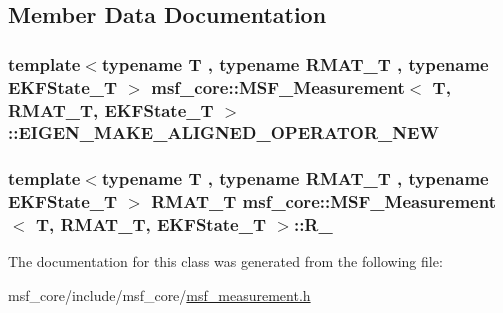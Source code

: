 \subsection{Member Data Documentation}
\hypertarget{classmsf__core_1_1MSF__Measurement_a481fa3230f73f28a8489223311c3033f}{
\subsubsection[{E\-I\-G\-E\-N\-\_\-\-M\-A\-K\-E\-\_\-\-A\-L\-I\-G\-N\-E\-D\-\_\-\-O\-P\-E\-R\-A\-T\-O\-R\-\_\-\-N\-E\-W}]{\setlength{\rightskip}{0pt plus 5cm}template$<$typename T , typename R\-M\-A\-T\-\_\-\-T , typename E\-K\-F\-State\-\_\-\-T $>$ {\bf msf\-\_\-core\-::\-M\-S\-F\-\_\-\-Measurement}$<$ T, R\-M\-A\-T\-\_\-\-T, E\-K\-F\-State\-\_\-\-T $>$\-::E\-I\-G\-E\-N\-\_\-\-M\-A\-K\-E\-\_\-\-A\-L\-I\-G\-N\-E\-D\-\_\-\-O\-P\-E\-R\-A\-T\-O\-R\-\_\-\-N\-E\-W}}\label{classmsf__core_1_1MSF__Measurement_a481fa3230f73f28a8489223311c3033f}
\hypertarget{classmsf__core_1_1MSF__Measurement_a20fcacb533df8a1e6ae4fad4a3eb06ec}{
\subsubsection[{R\-\_\-}]{\setlength{\rightskip}{0pt plus 5cm}template$<$typename T , typename R\-M\-A\-T\-\_\-\-T , typename E\-K\-F\-State\-\_\-\-T $>$ R\-M\-A\-T\-\_\-\-T {\bf msf\-\_\-core\-::\-M\-S\-F\-\_\-\-Measurement}$<$ T, R\-M\-A\-T\-\_\-\-T, E\-K\-F\-State\-\_\-\-T $>$\-::R\-\_\-\hspace{0.3cm}{\ttfamily [protected]}}}\label{classmsf__core_1_1MSF__Measurement_a20fcacb533df8a1e6ae4fad4a3eb06ec}


The documentation for this class was generated from the following file\-:\begin{DoxyCompactItemize}
\item 
msf\-\_\-core/include/msf\-\_\-core/\hyperlink{msf__measurement_8h}{msf\-\_\-measurement.\-h}\end{DoxyCompactItemize}
